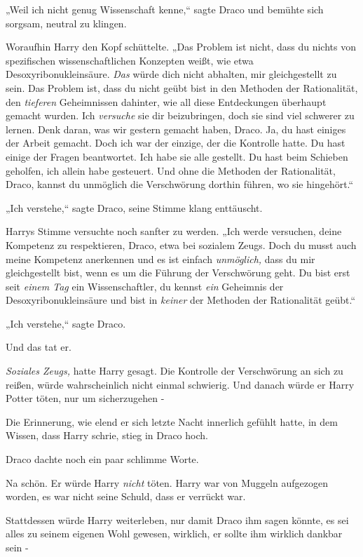 {„Weil ich nicht genug Wissenschaft kenne,“ sagte Draco und bemühte sich sorgsam, neutral zu klingen.

Woraufhin Harry den Kopf schüttelte. „Das Problem ist nicht, dass du nichts von spezifischen wissenschaftlichen Konzepten weißt, wie etwa Desoxyribonukleinsäure. \emph{Das} würde dich nicht abhalten, mir gleichgestellt zu sein. Das Problem ist, dass du nicht geübt bist in den Methoden der Rationalität, den \emph{tieferen} Geheimnissen dahinter, wie all diese Entdeckungen überhaupt gemacht wurden. Ich \emph{versuche} sie dir beizubringen, doch sie sind viel schwerer zu lernen. Denk daran, was wir gestern gemacht haben, Draco. Ja, du hast einiges der Arbeit gemacht. Doch ich war der einzige, der die Kontrolle hatte. Du hast einige der Fragen beantwortet. Ich habe sie alle gestellt. Du hast beim Schieben geholfen, ich allein habe gesteuert. Und ohne die Methoden der Rationalität, Draco, kannst du unmöglich die Verschwörung dorthin führen, wo sie hingehört.“

„Ich verstehe,“ sagte Draco, seine Stimme klang enttäuscht.

Harrys Stimme versuchte noch sanfter zu werden. „Ich werde versuchen, deine Kompetenz zu respektieren, Draco, etwa bei sozialem Zeugs. Doch du musst auch meine Kompetenz anerkennen und es ist einfach \emph{unmöglich,} dass du mir gleichgestellt bist, wenn es um die Führung der Verschwörung geht. Du bist erst seit \emph{einem Tag} ein Wissenschaftler, du kennst \emph{ein} Geheimnis der Desoxyribonukleinsäure und bist in \emph{keiner} der Methoden der Rationalität geübt.“

„Ich verstehe,“ sagte Draco.

Und das tat er.

\emph{Soziales Zeugs,} hatte Harry gesagt. Die Kontrolle der Verschwörung an sich zu reißen, würde wahrscheinlich nicht einmal schwierig. Und danach würde er Harry Potter töten, nur um sicherzugehen -

Die Erinnerung, wie elend er sich letzte Nacht innerlich gefühlt hatte, in dem Wissen, dass Harry schrie, stieg in Draco hoch.

Draco dachte noch ein paar schlimme Worte.

Na schön. Er würde Harry \emph{nicht} töten. Harry war von Muggeln aufgezogen worden, es war nicht seine Schuld, dass er verrückt war.

Stattdessen würde Harry weiterleben, nur damit Draco ihm sagen könnte, es sei alles zu seinem eigenen Wohl gewesen, wirklich, er sollte ihm wirklich dankbar sein -

}

